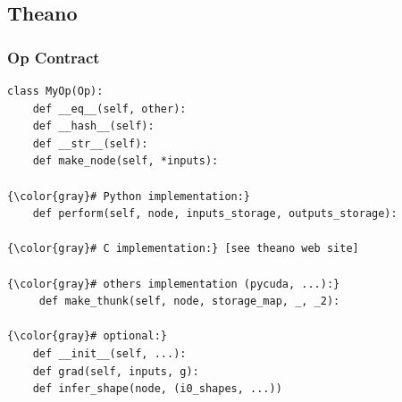 \documentclass[a4paper,9pt]{beamer}
\begin{document}
\subsection{Theano}

\begin{frame}[fragile]
\frametitle{Op Contract}
\begin{Verbatim}[commandchars=\\\{\}]
class MyOp(Op):
    def __eq__(self, other):
    def __hash__(self):
    def __str__(self):
    def make_node(self, *inputs):

{\color{gray}# Python implementation:}
    def perform(self, node, inputs_storage, outputs_storage):

{\color{gray}# C implementation:} [see theano web site]

{\color{gray}# others implementation (pycuda, ...):}
     def make_thunk(self, node, storage_map, _, _2):

{\color{gray}# optional:}
    def __init__(self, ...):
    def grad(self, inputs, g):
    def infer_shape(node, (i0_shapes, ...))
\end{Verbatim}
\end{frame}
\end{document}
